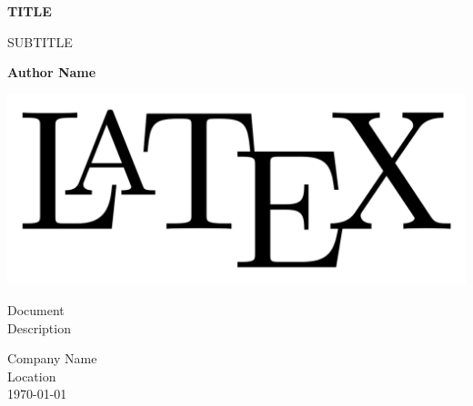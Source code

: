\documentclass[../main-tex/main-document.tex]{subfiles}
\begin{document}
\begin{titlepage}
    \begin{center}
        \vspace*{1cm}

        \begin{Huge}
            \textbf{TITLE}
        \end{Huge}

        \vspace{0.5cm}

        SUBTITLE

        \vspace{1.5cm}

        \textbf{Author Name}

        \vspace{0.8cm}     

        \includegraphics[width=\textwidth, keepaspectratio]{../pics/latex.png}

        \vfill      

        Document\\
        Description   

        \vspace{0.8cm} 

        Company Name\\
        Location\\
        \today           
    \end{center}
\end{titlepage}
\end{document}
